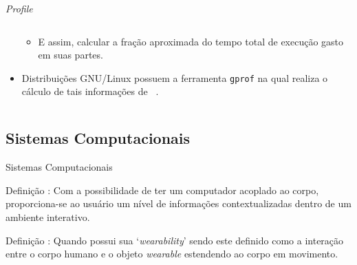 \begin{frame}{\textit{Profile}}
\begin{columns}
\begin{column}{0.5\textwidth}
\begin{itemize}
\begin{itemize}
                  \item E assim, calcular a fração aproximada do tempo total de execução gasto em suas partes. 
               \end{itemize}
               
               \item Distribuições GNU/Linux possuem a ferramenta \texttt{gprof} na qual realiza o cálculo de tais informações de \software\ \cite{Graham1982}.
            \end{itemize}
         \end{column}
      \end{columns}
      
   \end{frame}


   \subsection{Sistemas Computacionais \Wearables}

      \begin{frame} {Sistemas Computacionais \Wearables} \vspace{-1em}
         \begin{block}{Definição \cite{Amorim2017}:} 
            Com a possibilidade de ter um computador acoplado ao corpo, proporciona-se ao usuário um nível de informações contextualizadas dentro de um ambiente interativo.
         \end{block}
            
            \bigskip
      
         \begin{block}{Definição \cite{Gemperle1998}:} 
            Quando possui sua `\textit{wearability}' sendo este definido como a interação entre o corpo humano e o objeto \textit{wearable} estendendo ao corpo em movimento.
         \end{block}
      
         
      \end{frame}
   
